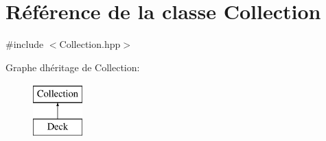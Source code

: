 \hypertarget{classCollection}{}\section{Référence de la classe Collection}
\label{classCollection}


{\ttfamily \#include $<$Collection.\+hpp$>$}

Graphe d\textquotesingle{}héritage de Collection\+:\begin{figure}[H]
\begin{center}
\leavevmode
\includegraphics[height=2.000000cm]{classCollection}
\end{center}
\end{figure}
